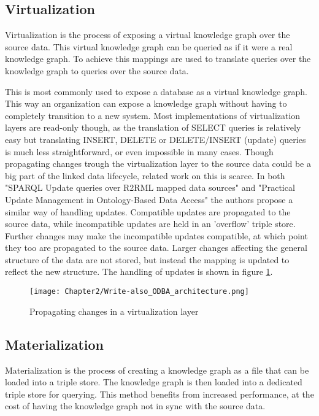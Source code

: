 \subsection{Virtualization}
Virtualization is the process of exposing a virtual knowledge graph over the source data. This virtual knowledge graph can be queried as if it were a real knowledge graph. To achieve this mappings are used to translate queries over the knowledge graph to queries over the source data.

This is most commonly used to expose a database as a virtual knowledge graph. This way an organization can expose a knowledge graph without having to completely transition to a new system. Most implementations of virtualization layers are read-only though, as the translation of SELECT queries is relatively easy but translating INSERT, DELETE or DELETE/INSERT (update) queries is much less straightforward, or even impossible in many cases. Though propagating changes trough the virtualization layer to the source data could be a big part of the linked data lifecycle, related work on this is scarce. In both "SPARQL Update queries over R2RML mapped data sources" \citep{unbehauen-k-2017--sparqlUpdate} and "Practical Update Management in Ontology-Based Data Access" \citep{practical_update_management_in_ontology_based_data_access} the authors propose a similar way of handling updates. Compatible updates are propagated to the source data, while incompatible updates are held in an 'overflow' triple store. Further changes may make the incompatible updates compatible, at which point they too are propagated to the source data. Larger changes affecting the general structure of the data are not stored, but instead the mapping is updated to reflect the new structure. The handling of updates is shown in figure \ref{fig:virtualization_update}.

\begin{figure}
    \centering
    \texttt{[image: Chapter2/Write-also\_ODBA\_architecture.png]}
    \caption{Propagating changes in a virtualization layer}
    \label{fig:virtualization_update}
\end{figure}

\subsection{Materialization}
Materialization is the process of creating a knowledge graph as a file that can be loaded into a triple store. The knowledge graph is then loaded into a dedicated triple store for querying. This method benefits from increased performance, at the cost of having the knowledge graph not in sync with the source data.


